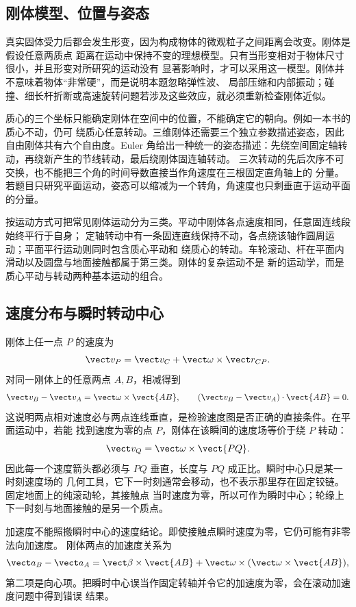 \subsection*{刚体模型、位置与姿态}

真实固体受力后都会发生形变，因为构成物体的微观粒子之间距离会改变。刚体是假设任意两质点
距离在运动中保持不变的理想模型。只有当形变相对于物体尺寸很小，并且形变对所研究的运动没有
显著影响时，才可以采用这一模型。刚体并不意味着物体“非常硬”，而是说明本题忽略弹性波、
局部压缩和内部振动；碰撞、细长杆折断或高速旋转问题若涉及这些效应，就必须重新检查刚体近似。

质心的三个坐标只能确定刚体在空间中的位置，不能确定它的朝向。例如一本书的质心不动，仍可
绕质心任意转动。三维刚体还需要三个独立参数描述姿态，因此自由刚体共有六个自由度。Euler
角给出一种统一的姿态描述：先绕空间固定轴转动，再绕新产生的节线转动，最后绕刚体固连轴转动。
三次转动的先后次序不可交换，也不能把三个角的时间导数直接当作角速度在三根固定直角轴上的
分量。若题目只研究平面运动，姿态可以缩减为一个转角，角速度也只剩垂直于运动平面的分量。

按运动方式可把常见刚体运动分为三类。平动中刚体各点速度相同，任意固连线段始终平行于自身；
定轴转动中有一条固连直线保持不动，各点绕该轴作圆周运动；平面平行运动则同时包含质心平动和
绕质心的转动。车轮滚动、杆在平面内滑动以及圆盘与地面接触都属于第三类。刚体的复杂运动不是
新的运动学，而是质心平动与转动两种基本运动的组合。

\subsection*{速度分布与瞬时转动中心}

刚体上任一点 $P$ 的速度为
\[
  \vect v_P=\vect v_C+\vect\omega\times\vect r_{CP}.
\]
对同一刚体上的任意两点 $A,B$，相减得到
\[
  \vect v_B-\vect v_A=\vect\omega\times\vect{AB},
  \qquad
  (\vect v_B-\vect v_A)\cdot\vect{AB}=0.
\]
这说明两点相对速度必与两点连线垂直，是检验速度图是否正确的直接条件。在平面运动中，若能
找到速度为零的点 $P$，刚体在该瞬间的速度场等价于绕 $P$ 转动：
\[
  \vect v_Q=\vect\omega\times\vect{PQ}.
\]
因此每一个速度箭头都必须与 $PQ$ 垂直，长度与 $PQ$ 成正比。瞬时中心只是某一时刻速度场的
几何工具，它下一时刻通常会移动，也不表示那里存在固定铰链。固定地面上的纯滚动轮，其接触点
当时速度为零，所以可作为瞬时中心；轮缘上下一时刻与地面接触的是另一个质点。

加速度不能照搬瞬时中心的速度结论。即使接触点瞬时速度为零，它仍可能有非零法向加速度。
刚体两点的加速度关系为
\[
  \vect a_B-\vect a_A
  =\vect\beta\times\vect{AB}
  +\vect\omega\times(\vect\omega\times\vect{AB}),
\]
第二项是向心项。把瞬时中心误当作固定转轴并令它的加速度为零，会在滚动加速度问题中得到错误
结果。


